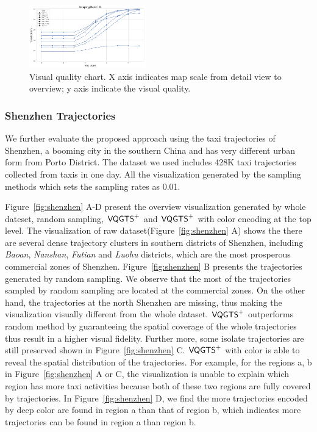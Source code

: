 \begin{figure}[t]
	\centering
	\vspace{2mm}
	\includegraphics[width=0.45\textwidth]{pictures/experiment_study/quanlity.png}
	\caption{Visual quality chart. X axis indicates map scale from detail view to overview; y axis indicate the visual quality. }
	\vspace{0mm}
	\label{fig:quality_chart}
\end{figure}


\subsubsection{Shenzhen Trajectories}
We further evaluate the proposed approach using the taxi trajectories of Shenzhen, a booming city in the southern China and has very different urban form from Porto District. The dataset we used includes 428K taxi trajectories collected from \QM{**} taxis in one day. All the visualization generated by the sampling methods which sets the sampling rates as 0.01.

Figure~\ref{fig:shenzhen} A-D present the overview visualization generated by whole dateset, random sampling, $\mathsf{VQGTS}^{+}$ and $\mathsf{VQGTS}^{+}$ with color encoding at the top level. The visualization of raw dataset(Figure~\ref{fig:shenzhen} A) shows the there are several dense trajectory clusters in southern districts of Shenzhen, including \textit{Baoan}, \textit{Nanshan}, \textit{Futian} and \textit{Luohu} districts, which are the most prosperous commercial zones of Shenzhen. Figure~\ref{fig:shenzhen} B presents the trajectories generated by random sampling. We observe that the most of the trajectories sampled by random sampling are located at the commercial zones. On the other hand, the trajectories at the north Shenzhen are missing, thus making the visualization visually different from the whole dataset.
$\mathsf{VQGTS}^{+}$ outperforms random method by guaranteeing the spatial coverage of the whole trajectories thus result in a higher visual fidelity. Further more, some isolate trajectories are still preserved shown in Figure~\ref{fig:shenzhen} C. $\mathsf{VQGTS}^{+}$ with color is able to reveal the spatial distribution of the trajectories. For example, for the regions a, b in Figure~\ref{fig:shenzhen} A or C, the visualization is unable to explain which region has more taxi activities because both of these two regions are fully covered by trajectories. In Figure~\ref{fig:shenzhen} D, we find the more trajectories encoded by deep color are found in region a than that of region b, which indicates more trajectories can be found in region a than region b.

